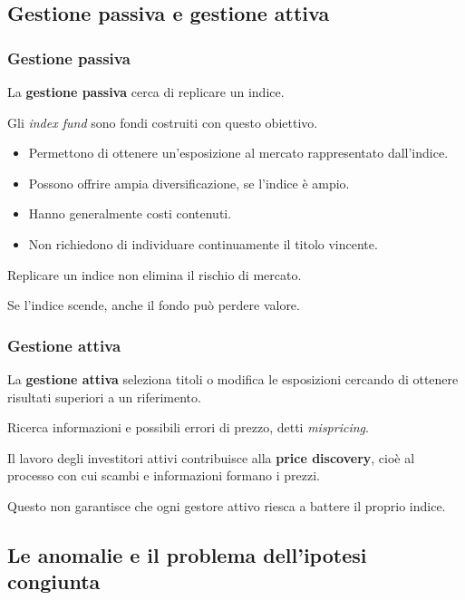 \subsection{Gestione passiva e gestione attiva}

\subsubsection*{Gestione passiva}

\noindent La \textbf{gestione passiva}
cerca di replicare un indice.

\noindent Gli \textit{index fund}
sono fondi costruiti con questo obiettivo.

\begin{itemize}
    \item Permettono di ottenere un'esposizione
    al mercato rappresentato dall'indice.

    \item Possono offrire ampia diversificazione,
    se l'indice è ampio.

    \item Hanno generalmente costi contenuti.

    \item Non richiedono di individuare continuamente
    il titolo vincente.
\end{itemize}

\noindent Replicare un indice
non elimina il rischio di mercato.

\noindent Se l'indice scende,
anche il fondo può perdere valore.


\subsubsection*{Gestione attiva}

\noindent La \textbf{gestione attiva}
seleziona titoli o modifica le esposizioni
cercando di ottenere risultati superiori
a un riferimento.

\noindent Ricerca informazioni e possibili
errori di prezzo, detti \textit{mispricing}.

\medskip

\noindent Il lavoro degli investitori attivi
contribuisce alla \textbf{price discovery},
cioè al processo con cui scambi e informazioni
formano i prezzi.

\noindent Questo non garantisce
che ogni gestore attivo riesca
a battere il proprio indice.


\subsection{Le anomalie e il problema dell'ipotesi congiunta}


